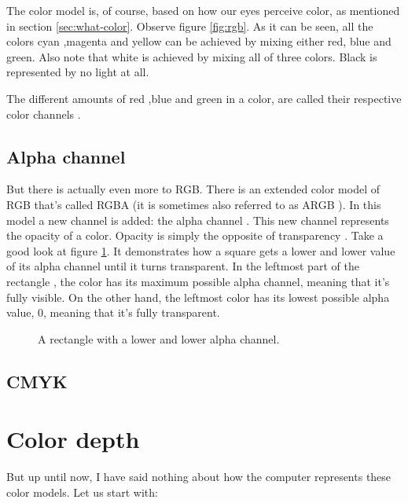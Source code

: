 \begin{refsection}
  The color model is, of course, based on how our eyes perceive color,
  as mentioned in section \ref{sec:what-color}. Observe figure
  \ref{fig:rgb}. As it can be seen, all the colors cyan ,magenta and
  yellow can be achieved by mixing either red, blue and green. Also note
  that white is achieved by mixing all of three colors. Black is
  represented by no light at all.

  The different amounts of red ,blue and green in a color, are called
  their respective color channels .

  \subsection{Alpha channel}
  \label{sec:alpha_chan}

  But there is actually even more to RGB. There is an extended color
  model of RGB that's called RGBA (it is sometimes also
  referred to as ARGB ). In this model a new channel is
  added: the alpha channel . This new channel
  represents the opacity of a color. Opacity is simply the opposite of
  transparency \cite{porter84_compos_dig_img}. Take
  a good look at figure \ref{fig:alpha}. It demonstrates how a square
  gets a lower and lower value of its alpha channel until it turns
  transparent. In the leftmost part of the rectangle , the color has
  its maximum possible alpha channel, meaning that it's fully
  visible. On the other hand, the leftmost color has its lowest
  possible alpha value, $0$, meaning that it's fully transparent.

  \begin{figure}[h!]
    \centering
    \caption{A rectangle with a lower and lower alpha channel.}
    \label{fig:alpha}
  \end{figure}

  \subsection{CMYK}
  \label{sec:cmyk}


  \section{Color depth}
  \label{sec:color-depth}

  \newcommand{\rgbtrip}[3]{( \textcolor{red}{#1},\textcolor{green}{#2},\textcolor{blue}{#3})}

  But up until now, I have said nothing about how the computer
  represents these color models. Let us start with:


\end{refsection}
